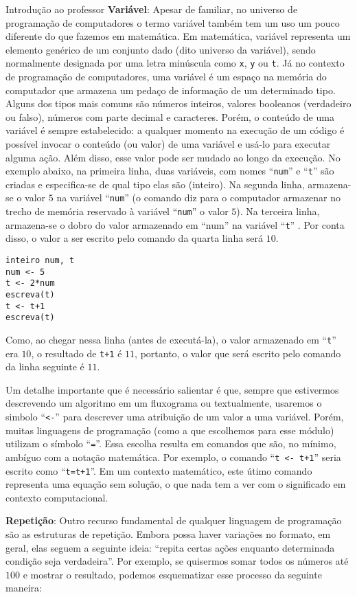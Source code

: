 \begin{apresentacao}{Introdução ao professor}
\textbf{Variável}: Apesar de familiar, no universo de programação de computadores o termo variável também tem um uso um pouco diferente do que fazemos em matemática. Em matemática, variável representa um elemento genérico de um conjunto dado (dito universo da variável), sendo normalmente designada por uma letra minúscula como \verb|x|, \verb|y| ou \verb|t|. Já no contexto de programação de computadores, uma variável é um espaço na memória do computador que armazena um pedaço de informação de um determinado tipo. Alguns dos tipos mais comuns são números inteiros, valores booleanos (verdadeiro ou falso), números com parte decimal e caracteres. Porém, o conteúdo de uma variável é sempre estabelecido: a qualquer momento na execução de um código é possível invocar o conteúdo (ou valor) de uma variável e usá-lo para executar alguma ação. Além disso, esse valor pode ser mudado ao longo da execução. No exemplo abaixo, na primeira linha, duas variáveis, com nomes “\verb|num|” e “\verb|t|” são criadas e especifica-se de qual tipo elas são (inteiro). Na segunda linha, armazena-se o valor $5$ na variável “\verb|num|” (o comando diz para o computador armazenar no trecho de memória reservado à variável “\verb|num|” o valor $5$). Na terceira linha, armazena-se o dobro do valor armazenado em “num” na variável “\verb|t|” . Por conta disso, o valor a ser escrito pelo comando da quarta linha será $10$.
\begin{verbatim}
inteiro num, t
num <- 5
t <- 2*num
escreva(t)
t <- t+1
escreva(t)
\end{verbatim}

Como, ao chegar nessa linha (antes de executá-la), o valor armazenado em “\verb|t|” era $10$, o resultado de \verb|t+1| é $11$, portanto, o valor que será escrito pelo comando da linha seguinte é $11$.

Um detalhe importante que é necessário salientar é que, sempre que estivermos descrevendo um algoritmo em um fluxograma ou textualmente, usaremos o simbolo “\verb|<-|” para descrever uma atribuição de um valor a uma variável. Porém, muitas linguagens de programação (como a que escolhemos para esse módulo) utilizam o símbolo “\verb|=|”. Essa escolha resulta em comandos que são, no mínimo, ambíguo com a notação matemática. Por exemplo, o comando “\verb|t <- t+1|” seria escrito como “\verb|t=t+1|”. Em um contexto matemático, este útimo comando representa uma equação sem solução, o que nada tem a ver com o significado em contexto computacional.

\textbf{Repetição}: Outro recurso fundamental de qualquer linguagem de programação são as estruturas de repetição. Embora possa haver variações no formato, em geral, elas seguem a seguinte ideia: “repita certas ações enquanto determinada condição seja verdadeira”. Por exemplo, se quisermos somar todos os números até $100$ e mostrar o resultado, podemos esquematizar esse processo da seguinte maneira:


\end{apresentacao}
